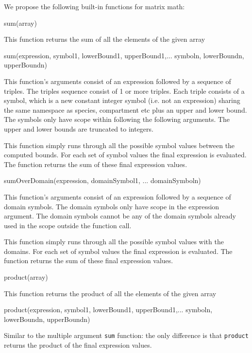 \documentclass{cekarticle}
\begin{document}
We propose the following built-in functions for matrix math:

\begin{example}
sum(array)
\end{example}

This function returns the sum of all the elements of the given array

\begin{example}
sum(expression, symbol1, lowerBound1, upperBound1,...
    symboln, lowerBoundn, upperBoundn)
\end{example}
This function's arguments consist of an expression followed by a
sequence of triples.  The triples sequence consist of 1 or more
triples. Each triple consists of a symbol, which is a new
constant integer symbol (i.e. not an expression) sharing the same
namespace as species, compartment etc plus an upper and lower
bound.  The symbols only have scope within following the following
arguments.  The upper and lower bounds are truncated to integers.

This function simply runs through all the possible symbol values
between the computed bounds.  For each set of symbol values the
final expression is evaluated.  The function returns the sum of
these final expression values.

\begin{example}
sumOverDomain(expression, domainSymbol1, ... domainSymboln)
\end{example}
This function's arguments consist of an expression followed by a
sequence of domain symbols.  The domain symbols only have scope
in the expression argument.  The domain symbols cannot be any of
the domain symbols already used in the scope outside the function
call.

This function simply runs through all the possible symbol values
with the domains.  For each set of symbol values the final
expression is evaluated.  The function returns the sum of these
final expression values.

\begin{example}
product(array)
\end{example}
This function returns the product of all the elements of the
given array

\begin{example}
product(expression, symbol1, lowerBound1, upperBound1,...
    symboln, lowerBoundn, upperBoundn)
\end{example}
Similar to the multiple argument \texttt{sum} function: the only
difference is that \texttt{product} returns the product of the final
expression values.
\end{document}
